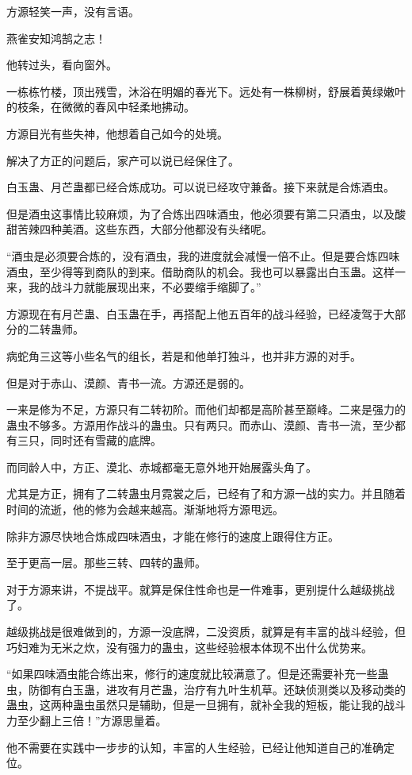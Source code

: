 \begin{this_body}
方源轻笑一声，没有言语。

燕雀安知鸿鹄之志！

他转过头，看向窗外。

一栋栋竹楼，顶出残雪，沐浴在明媚的春光下。远处有一株柳树，舒展着黄绿嫩叶的枝条，在微微的春风中轻柔地拂动。

方源目光有些失神，他想着自己如今的处境。

解决了方正的问题后，家产可以说已经保住了。

白玉蛊、月芒蛊都已经合炼成功。可以说已经攻守兼备。接下来就是合炼酒虫。

但是酒虫这事情比较麻烦，为了合炼出四味酒虫，他必须要有第二只酒虫，以及酸甜苦辣四种美酒。这些东西，大部分他都没有头绪呢。

“酒虫是必须要合炼的，没有酒虫，我的进度就会减慢一倍不止。但是要合炼四味酒虫，至少得等到商队的到来。借助商队的机会。我也可以暴露出白玉蛊。这样一来，我的战斗力就能展现出来，不必要缩手缩脚了。”

方源现在有月芒蛊、白玉蛊在手，再搭配上他五百年的战斗经验，已经凌驾于大部分的二转蛊师。

病蛇角三这等小些名气的组长，若是和他单打独斗，也并非方源的对手。

但是对于赤山、漠颜、青书一流。方源还是弱的。

一来是修为不足，方源只有二转初阶。而他们却都是高阶甚至巅峰。二来是强力的蛊虫不够多。方源用作战斗的蛊虫。只有两只。而赤山、漠颜、青书一流，至少都有三只，同时还有雪藏的底牌。

而同龄人中，方正、漠北、赤城都毫无意外地开始展露头角了。

尤其是方正，拥有了二转蛊虫月霓裳之后，已经有了和方源一战的实力。并且随着时间的流逝，他的修为会越来越高。渐渐地将方源甩远。

除非方源尽快地合炼成四味酒虫，才能在修行的速度上跟得住方正。

至于更高一层。那些三转、四转的蛊师。

对于方源来讲，不提战平。就算是保住性命也是一件难事，更别提什么越级挑战了。

越级挑战是很难做到的，方源一没底牌，二没资质，就算是有丰富的战斗经验，但巧妇难为无米之炊，没有强力的蛊虫，这些经验根本体现不出什么优势来。

“如果四味酒虫能合练出来，修行的速度就比较满意了。但是还需要补充一些蛊虫，防御有白玉蛊，进攻有月芒蛊，治疗有九叶生机草。还缺侦测类以及移动类的蛊虫，这两种蛊虫虽然只是辅助，但是一旦拥有，就补全我的短板，能让我的战斗力至少翻上三倍！”方源思量着。

他不需要在实践中一步步的认知，丰富的人生经验，已经让他知道自己的准确定位。


\end{this_body}

